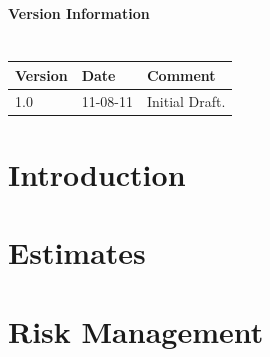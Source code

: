 \documentclass[11pt]{article}
\begin{document}
\tableofcontents			%
\setcounter{tocdepth}{1}		%

\newpage
\paragraph{Version Information\\\\} 
\begin{tabular}{|p{1.5cm}|p{1.5cm}|p{10cm}|} \hline
Version & Date & Comment \\ \hline
1.0 & 11-08-11 & Initial Draft. \\

\hline
\end{tabular}

\newpage
{}
\setcounter{page}{1}

\section{Introduction}

\section{Estimates}
\section{Risk Management}

\newpage
\end{document}
